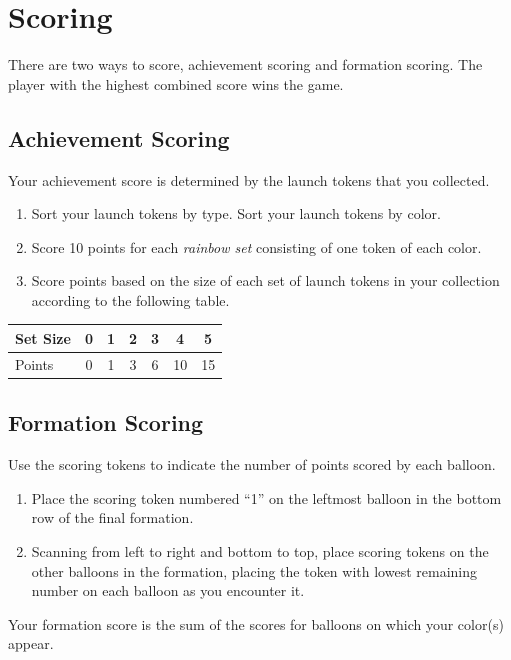 \documentclass[a6paper, 11pt, parskip=half, DIV=15]{scrartcl}
\begin{document}
\section*{Scoring}

There are two ways to score, achievement scoring and formation scoring. The player with the highest combined score wins the game.

\subsection*{Achievement Scoring}
Your achievement score is determined by the launch tokens that you collected.

\begin{enumerate}
	\item Sort your launch tokens by type. Sort your launch tokens by color.
	\item Score 10 points for each \emph{rainbow set} consisting of one token of each color.
	\item Score points based on the size of each set of launch tokens in your collection according to the following table.
\end{enumerate}
	\begin{center}
	\begin{tabular}{lcccccc}\toprule
	Set Size & 0 & 1 & 2 & 3 & 4 & 5 \\\midrule
	Points & 0 & 1 & 3 & 6 & 10 & 15\phantom{0} \\\bottomrule
	\end{tabular}
	\end{center}


\newpage
\enlargethispage{1.75\baselineskip}

\subsection*{Formation Scoring}
Use the scoring tokens to indicate the number of points scored by each balloon.
\begin{enumerate}
  \item Place the scoring token numbered ``1'' on the leftmost balloon in the bottom row of the final formation.
  \item Scanning from left to right and bottom to top, place scoring tokens on the other balloons in the formation, placing the token with lowest remaining number on each balloon as you encounter it.
\end{enumerate}

Your formation score is the sum of the scores for balloons on which your color(s) appear.
\end{document}
